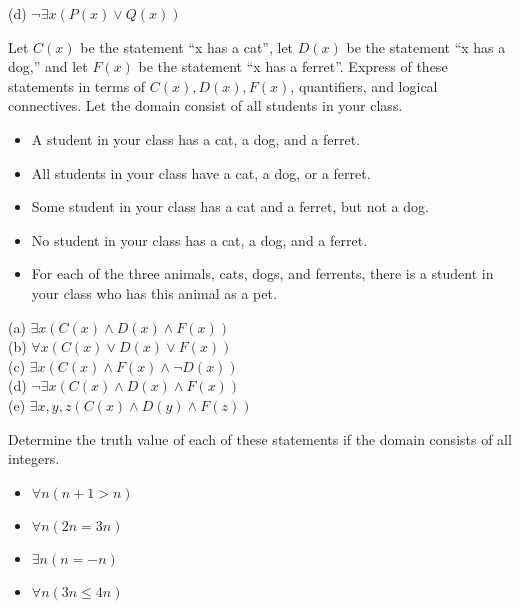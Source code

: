 \documentclass[addpoints]{exam}
\newenvironment{problem}[2][Problem]{\begin{trivlist}
    \item[\hskip \labelsep {\bfseries #1}\hskip \labelsep {\bfseries #2.}]}{\end{trivlist}}
\begin{document}
\begin{sloppypar}
\begin{questions}
\begin{solution}
        (d) $ \neg\exists x (P(x) \lor Q(x)) $
    \end{solution}
\end{questions}
\pagebreak
\begin{problem}{4}
Let $C(x)$ be the statement ``x has a cat'', let $D(x)$ be the statement ``x has a dog,'' and let $F(x)$ be the statement ``x has a ferret''. Express of these statements in terms of $C(x), D(x), F(x)$, quantifiers, and logical connectives.
Let the domain consist of all students in your class.
\begin{itemize}
    \item[(a)] A student in your class has a cat, a dog, and a ferret.
    \item[(b)] All students in your class have a cat, a dog, or a ferret.
    \item[(c)] Some student in your class has a cat and a ferret, but not a dog.
    \item[(d)] No student in your class has a cat, a dog, and a ferret.
    \item[(e)] For each of the three animals, cats, dogs, and ferrents, there is a student in your class who has this animal as a pet.
\end{itemize}
\end{problem}

\begin{questions}
    \question
    \begin{solution}
        
        (a) $ \exists x (C(x) \land D(x) \land F(x)) $ \\
        (b) $ \forall x (C(x) \lor D(x) \lor F(x)) $ \\ 
        (c) $ \exists x (C(x) \land F(x) \land \neg D(x)) $ \\ 
        (d) $ \neg\exists x (C(x) \land D(x) \land F(x)) $ \\ 
        (e) $ \exists x, y, z (C(x) \land D(y) \land F(z)) $
    \end{solution}
\end{questions}

\begin{problem}{5}
Determine the truth value of each of these statements if the domain consists of all integers.
\begin{itemize}
    \item[(a)] $\forall n (n + 1 > n)$
    \item[(b)] $\forall n (2n = 3n) $
    \item[(c)] $\exists n (n = -n)$
    \item[(d)] $\forall n (3n \leq 4n) $
\end{itemize}
\end{problem}


\end{sloppypar}
\end{document}
